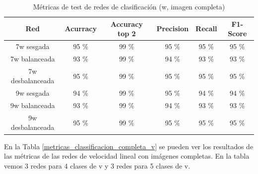 \begin{table}[H]
\centering
\caption{Métricas de test de redes de clasificación (w, imagen completa)}
\label{metricas_classificacion_completa_w}
\begin{tabular}{c|c|c|c|c|c|}
\cline{1-6}
                        \multicolumn{1}{|c|}{Red}    & Acurracy       & Accuracy top 2      & Precision       & Recall        & F1-Score        \\ \hline
\multicolumn{1}{|c|}{7w sesgada}    & 95 \%             & 99 \%         & 95 \%            & 95 \%          & 95 \%       \\ \hline
\multicolumn{1}{|c|}{7w balanceada}     & 93 \%             & 99 \%          &  94 \%              &  93 \%            &  93 \%             \\ \hline
\multicolumn{1}{|c|}{7w desbalanceada}      &  95 \%             & 99 \%           &  95 \%            & 95 \%        &  95 \%            \\ \hline
\multicolumn{1}{|c|}{9w sesgada}       & 94 \%     & 99 \%       & 95 \%      & 94 \%           & 94 \%               \\ \hline
\multicolumn{1}{|c|}{9w balanceada}      & 93 \%          & 99 \%         & 94 \%       & 93 \%       & 93 \%             \\ \hline
\multicolumn{1}{|c|}{9w desbalanceada}       & 95 \%        & 99 \%    & 95 \%        & 95 \%        & 95 \%                 \\ \hline
\end{tabular}
\end{table}

En la Tabla \ref{metricas_classificacion_completa_v} se pueden ver los resultados de las métricas de las redes de velocidad lineal con imágenes completas. En la tabla vemos 3 redes para 4 clases de v y 3 redes para 5 clases de v.\\

